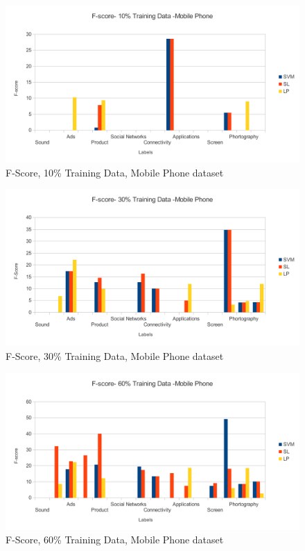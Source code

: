 \documentclass[4pt,a4paper,twocolumn]{article}
\begin{document}
\begin{figure}[]
  
  \centering
    \includegraphics[scale=0.7]{graphics/sony/halfData/fscore-10-sony}
    \caption{F-Score, 10\% Training Data, Mobile Phone dataset}
   \label{fig:sony_10_fscore_half}  
\end{figure}

\begin{figure}[]
  
  \centering
    \includegraphics[scale=0.7]{graphics/sony/halfData/fscore-30-sony}
    \caption{F-Score, 30\% Training Data, Mobile Phone dataset}
   \label{fig:sony_30_fscore_half}  
\end{figure}

\begin{figure}[]
  
  \centering
    \includegraphics[scale=0.7]{graphics/sony/halfData/fscore-60-sony}
    \caption{F-Score, 60\% Training Data, Mobile Phone dataset}
   \label{fig:sony_60_fscore_half}  
\end{figure}
\end{document}
